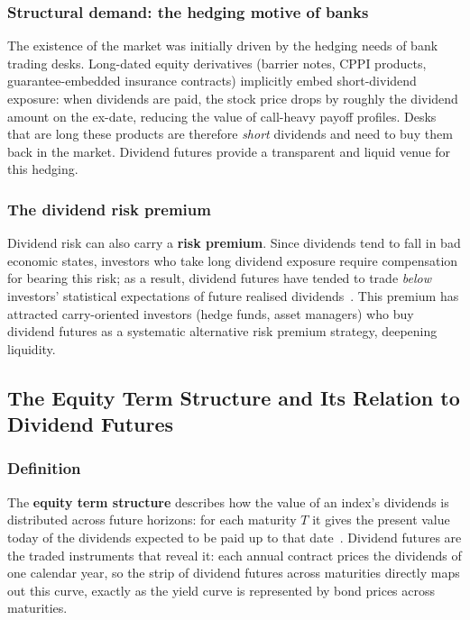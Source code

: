 \documentclass[12pt,a4paper]{article}
\begin{document}
\subsubsection*{Structural demand: the hedging motive of banks}
 
The existence of the market was initially driven by the hedging needs of bank trading
desks.
Long-dated equity derivatives (barrier notes, CPPI products, guarantee-embedded
insurance contracts) implicitly embed short-dividend exposure: when dividends are paid,
the stock price drops by roughly the dividend amount on the ex-date, reducing the
value of call-heavy payoff profiles.
Desks that are long these products are therefore \emph{short} dividends and need to
buy them back in the market.
Dividend futures provide a transparent and liquid venue for this hedging.
 
\subsubsection*{The dividend risk premium}
 
Dividend risk can also carry a \textbf{risk premium}. Since dividends tend to fall in
bad economic states, investors who take long dividend exposure require compensation for
bearing this risk; as a result, dividend futures have tended to trade \emph{below}
investors' statistical expectations of future realised dividends~\cite{vbk}.
This premium has attracted carry-oriented investors (hedge funds, asset managers) who
buy dividend futures as a systematic alternative risk premium strategy, deepening
liquidity.
 
\subsection*{The Equity Term Structure and Its Relation to Dividend Futures}
 
\subsubsection*{Definition}
 
The \textbf{equity term structure} describes how the value of an index's dividends is
distributed across future horizons: for each maturity $T$ it gives the present value
today of the dividends expected to be paid up to that date~\cite{vbk}.
Dividend futures are the traded instruments that reveal it: each annual contract prices
the dividends of one calendar year, so the strip of dividend futures across maturities
directly maps out this curve, exactly as the yield curve is represented by bond prices
across maturities.
 
\end{document}
